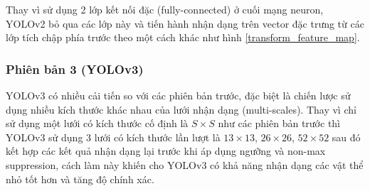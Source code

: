 \documentclass[../thesis.tex]{subfiles}
\begin{document}
Thay vì sử dụng 2 lớp kết nối đặc (fully-connected) ở cuối mạng neuron, YOLOv2 bỏ qua các lớp này và tiến hành nhận dạng trên vector đặc trưng từ các lớp tích chập phía trước theo một cách khác như hình \ref{transform_feature_map}.

\subsubsection{Phiên bản 3 (YOLOv3)}
  
YOLOv3 có nhiều cải tiến so với các phiên bản trước, đặc biệt là chiến lược sử dụng nhiều kích thước khác nhau của lưới nhận dạng (multi-scales). Thay vì chỉ sử dụng một lưới có kích thước cố định là $S \times S$ như các phiên bản trước thì YOLOv3 sử dụng 3 lưới có kích thước lần lượt là $13 \times 13$, $26 \times 26$, $52 \times 52$ sau đó kết hợp các kết quả nhận dạng lại trước khi áp dụng ngưỡng và non-max suppression, cách làm này khiến cho YOLOv3 có khả năng nhận dạng các vật thể nhỏ tốt hơn và tăng độ chính xác. 
  
\end{document}
